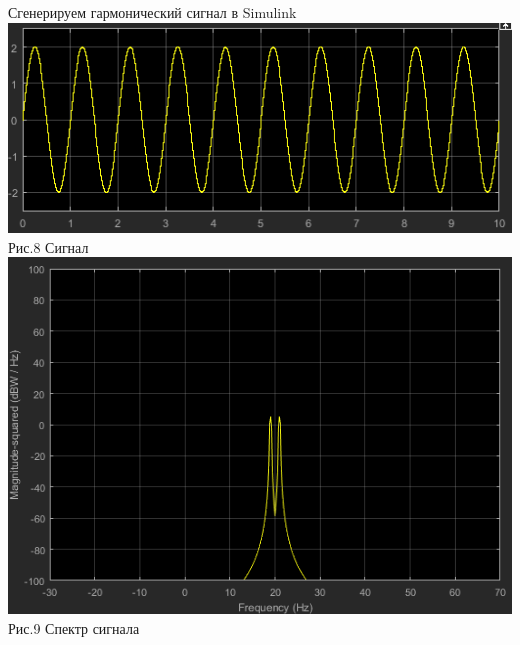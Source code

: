 \documentclass[a4paper,12pt]{article}
\begin{document}
Сгенерируем гармонический сигнал в Simulink
\center\includegraphics{pictures/SimulSignal.png} \\ Рис.8 Сигнал
\center\includegraphics{pictures/SimulSpecSignal.png} \\ Рис.9 Спектр сигнала
\end{document}

